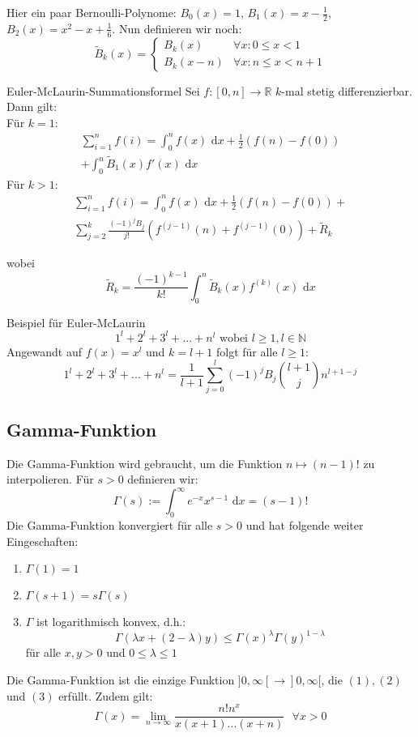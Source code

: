 \documentclass[a4paper,10pt]{article}
\def\limn{\lim_{n\to \infty}}
\def\R{\mathbb{R}}
\def\dx{\text{ d}x}
\begin{document}
Hier ein paar Bernoulli-Polynome: $B_0(x) = 1$, $B_1(x) = x - \frac{1}{2}$, $B_2(x) = x^2 - x + \frac{1}{6}$. Nun definieren wir noch: $$\tilde{B}_k(x) = \begin{cases}
  B_k(x) & \forall x: 0 \leq x < 1 \\
  B_k(x-n) & \forall x: n \leq x < n + 1
\end{cases}$$

\begin{mainbox}{Euler-McLaurin-Summationsformel}
  Sei $f: [0, n] \to \R$ $k$-mal stetig differenzierbar. Dann gilt: \\
  Für $k = 1$:
  \begin{align*}
  \sum_{i = 1}^n f(i) = \int_0^n f(x) \dx + \frac{1}{2}(f(n) - f(0)) \\ + \int_0^n \tilde{B}_1(x)f'(x)\dx
  \end{align*}
  Für $k>1$:
  \begin{align*}
  \sum_{i = 1}^n f(i) = \int_0^n f(x) \dx + \frac{1}{2}(f(n) - f(0))+ \\
  \sum_{j = 2}^k \frac{(-1)^j B_j}{j!}(f^{(j-1)}(n) + f^{(j-1)}(0)) + \tilde{R}_k
  \end{align*}
  
  wobei
  $$ \tilde{R}_k = \frac{(-1)^{k-1}}{k!} \int_0^n \tilde{B}_k(x)f^{(k)}(x)\dx$$
\end{mainbox}

\begin{subbox}{Beispiel für Euler-McLaurin}
  $$1^l + 2^l + 3^l + ... + n^l \text{ wobei } l \geq 1, l \in \mathbb{N}$$
  Angewandt auf $f(x) = x^l$ und $k = l + 1$ folgt für alle $l \geq 1$:
  $$1^l + 2^l + 3^l + ... + n^l = \frac{1}{l + 1} \sum_{j = 0}^l (-1)^j B_j {l + 1 \choose j} n^{l+1-j}$$
\end{subbox}

\subsection{Gamma-Funktion}
Die Gamma-Funktion wird gebraucht, um die Funktion $n \mapsto (n-1)!$ zu interpolieren. Für $s > 0$ definieren wir: $$\Gamma(s) := \int_0^\infty e^{-x}x^{s-1}\dx = (s-1)!$$
Die Gamma-Funktion konvergiert für alle $s > 0$ und hat folgende weiter Eingeschaften:
\begin{enumerate}
  \item $\Gamma(1) = 1$
  \item $\Gamma(s + 1) = s \Gamma(s)$
  \item $\Gamma$ ist logarithmisch konvex, d.h.: $$\Gamma(\lambda x + (2 - \lambda)y) \leq \Gamma(x)^\lambda \Gamma(y)^{1 - \lambda}$$ für alle $x, y > 0$ und $0 \leq \lambda \leq 1$
\end{enumerate}
Die Gamma-Funktion ist die einzige Funktion $]0, \infty[ \to ]0, \infty[$, die $(1), (2)$ und $(3)$ erfüllt. Zudem gilt: $$\Gamma(x) = \limn \frac{n!n^x}{x(x+1)...(x+n)} \ \ \ \forall x > 0$$
\end{document}
